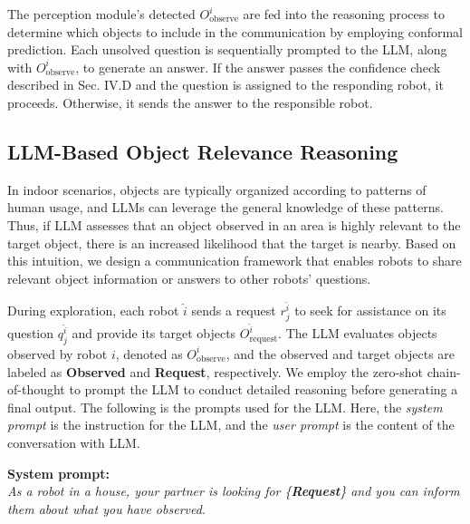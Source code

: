The perception module's detected $O^{i}_{\text{observe}}$ are fed into the reasoning process to determine which objects to include in the communication by employing conformal prediction.
Each unsolved question is sequentially prompted to the LLM, along with 
$O^{i}_{\text{observe}}$, to generate an answer. 
If the answer passes the confidence check described in Sec. IV.D and the question is assigned to the responding robot, it proceeds. Otherwise, it sends the answer to the responsible robot. 
\subsection{LLM-Based Object Relevance Reasoning}\label{sec:A}
In indoor scenarios, objects are typically organized according to patterns of human usage, and LLMs can leverage the general knowledge of these patterns. 
Thus, if LLM assesses that an object observed in an area is highly relevant to the target object, there is an increased likelihood that the target is nearby. Based on this intuition, we design a communication framework that enables robots to share relevant object information or answers to other robots' questions.

During exploration, each robot $\hat{i}$ sends a request $r^{\hat{i}}_j$ to seek for assistance on its question $q^{\hat{i}}_j$ and provide its target objects $O^{\hat{i}}_{\text{request}}$. 
The LLM evaluates objects observed by robot $i$, denoted as $O^{i}_{\text{observe}}$, and the observed and target objects are labeled as \textbf{Observed} and \textbf{Request}, respectively. We employ the zero-shot chain-of-thought \cite{kojima2022large} to prompt the LLM to conduct detailed reasoning before generating a final output. 
The following is the prompts used for the LLM. Here, the \textit{system prompt} is the instruction for the LLM, and the \textit{user prompt} is the content of the conversation with LLM.

\vspace{+0.1 cm}
\colorbox{lime!20}{
\parbox{\dimexpr0.90\linewidth-2\fboxsep}{
\raggedright
\fontsize{8.5pt}{\baselineskip}\selectfont
\textbf{System prompt:} \\
\textit{As a robot in a house, your partner is looking for \{\textbf{Request}\} and you can inform them about what you have observed.}
}}


